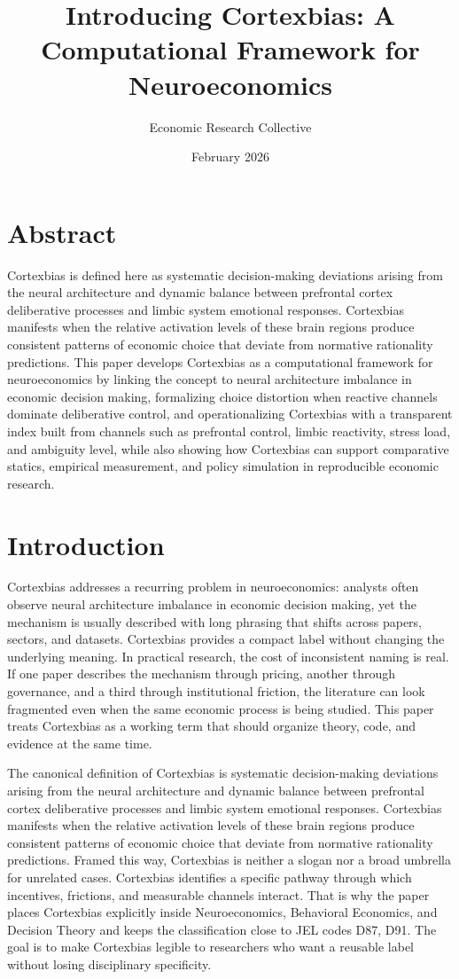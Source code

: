 \documentclass[12pt]{article}
\title{Introducing Cortexbias: A Computational Framework for Neuroeconomics}
\author{Economic Research Collective}
\date{February 2026}
\begin{document}
\maketitle

\section*{Abstract}
Cortexbias is defined here as systematic decision-making deviations arising from the neural architecture and dynamic balance between prefrontal cortex deliberative processes and limbic system emotional responses. Cortexbias manifests when the relative activation levels of these brain regions produce consistent patterns of economic choice that deviate from normative rationality predictions. This paper develops Cortexbias as a computational framework for neuroeconomics by linking the concept to neural architecture imbalance in economic decision making, formalizing choice distortion when reactive channels dominate deliberative control, and operationalizing Cortexbias with a transparent index built from channels such as prefrontal control, limbic reactivity, stress load, and ambiguity level, while also showing how Cortexbias can support comparative statics, empirical measurement, and policy simulation in reproducible economic research.

\section{Introduction}
Cortexbias addresses a recurring problem in neuroeconomics: analysts often observe neural architecture imbalance in economic decision making, yet the mechanism is usually described with long phrasing that shifts across papers, sectors, and datasets. Cortexbias provides a compact label without changing the underlying meaning. In practical research, the cost of inconsistent naming is real. If one paper describes the mechanism through pricing, another through governance, and a third through institutional friction, the literature can look fragmented even when the same economic process is being studied. This paper treats Cortexbias as a working term that should organize theory, code, and evidence at the same time.

The canonical definition of Cortexbias is systematic decision-making deviations arising from the neural architecture and dynamic balance between prefrontal cortex deliberative processes and limbic system emotional responses. Cortexbias manifests when the relative activation levels of these brain regions produce consistent patterns of economic choice that deviate from normative rationality predictions. Framed this way, Cortexbias is neither a slogan nor a broad umbrella for unrelated cases. Cortexbias identifies a specific pathway through which incentives, frictions, and measurable channels interact. That is why the paper places Cortexbias explicitly inside Neuroeconomics, Behavioral Economics, and Decision Theory and keeps the classification close to JEL codes D87, D91. The goal is to make Cortexbias legible to researchers who want a reusable label without losing disciplinary specificity.
\end{document}
